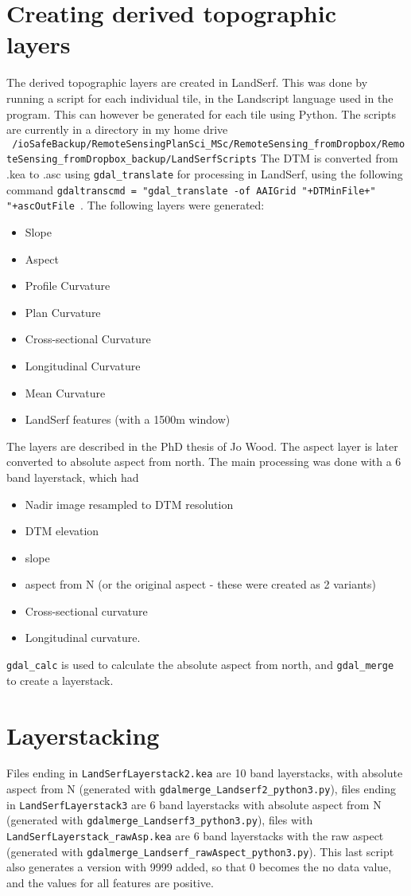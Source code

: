 \documentclass[a4paper,12pt]{article}
\begin{document}
\section{Creating derived topographic layers}
The derived topographic layers are created in LandSerf. This was done by running a script for each individual tile, in the Landscript language used in the program. This can however be generated for each tile using Python.
The scripts are currently in a directory in my home drive {\tt ~/ioSafeBackup/RemoteSensingPlanSci\_MSc/RemoteSensing\_fromDropbox/RemoteSensing\_fromDropbox\_backup/LandSerfScripts}
The DTM is converted from .kea to .asc using {\tt gdal\_translate} for processing in LandSerf, using the following command {\tt gdaltranscmd = "gdal\_translate -of AAIGrid "+DTMinFile+" "+ascOutFile
}.
The following layers were generated:
\begin{itemize}
 \item Slope
 \item Aspect
 \item Profile Curvature
 \item Plan Curvature
 \item Cross-sectional Curvature
 \item Longitudinal Curvature
 \item Mean Curvature
 \item LandSerf features (with a 1500m window)
\end{itemize}
The layers are described in the PhD thesis of Jo Wood. The aspect layer is later converted to absolute aspect from north. The main processing was done with a 6 band layerstack, which had 
\begin{itemize}
 \item Nadir image resampled to DTM resolution
 \item DTM elevation
 \item slope
 \item aspect from N (or the original aspect - these were created as 2 variants)
 \item Cross-sectional curvature
 \item Longitudinal curvature.
\end{itemize}
{\tt gdal\_calc} is used to calculate the absolute aspect from north, and {\tt gdal\_merge} to create a layerstack.
\section{Layerstacking}
Files ending in {\tt LandSerfLayerstack2.kea} are 10 band layerstacks, with absolute aspect from N (generated with {\tt gdalmerge\_Landserf2\_python3.py}), files ending in {\tt LandSerfLayerstack3} are 6 band layerstacks with absolute aspect from N (generated with {\tt gdalmerge\_Landserf3\_python3.py}), files with {\tt LandSerfLayerstack\_rawAsp.kea} are 6 band layerstacks with the raw aspect (generated with {\tt gdalmerge\_Landserf\_rawAspect\_python3.py}). This last script also generates a version with 9999 added, so that 0 becomes the no data value, and the values for all features are positive.
\end{document}
